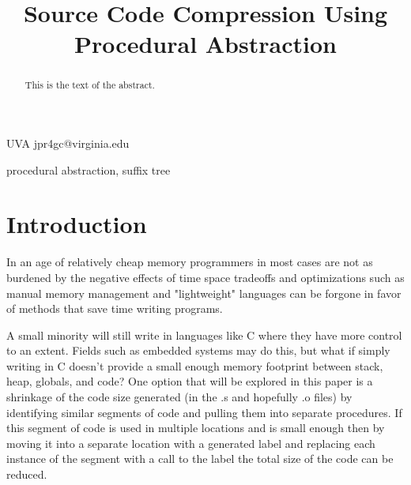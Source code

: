 \documentclass[9pt,nocopyrightspace]{sigplanconf}
\begin{document}
\setlength{\pdfpageheight}{\paperheight}
\setlength{\pdfpagewidth}{\paperwidth}






\title{Source Code Compression Using Procedural Abstraction}
\subtitle{}

           {UVA}
           {jpr4gc@virginia.edu}

\maketitle

\begin{abstract}
This is the text of the abstract.
\end{abstract}



\keywords
procedural abstraction, suffix tree

\section{Introduction}

In an age of relatively cheap memory programmers in most cases are not as burdened by the negative effects of time space tradeoffs and optimizations such as manual memory management and "lightweight" languages can be forgone in favor of methods that save time writing programs.

A small minority will still write in languages like C where they have more control to an extent.
Fields such as embedded systems may do this, but what if simply writing in C doesn't provide a small enough memory footprint between stack, heap, globals, and code? One option that will be explored in this paper is a shrinkage of the code size generated (in the .s and hopefully .o files) by identifying similar segments of code and pulling them into separate procedures.
If this segment of code is used in multiple locations and is small enough then by moving it into a separate location with a generated label and replacing each instance of the segment with a call to the label the total size of the code can be reduced.
\end{document}
